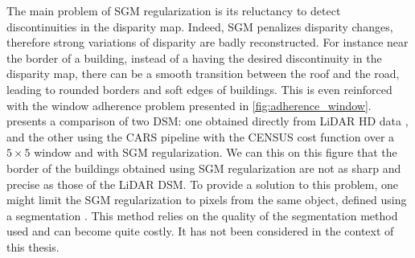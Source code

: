 The main problem of SGM regularization is its reluctancy to detect discontinuities in the disparity map. Indeed, SGM penalizes disparity changes, therefore strong variations of disparity are badly reconstructed. For instance near the border of a building, instead of a having the desired discontinuity in the disparity map, there can be a smooth transition between the roof and the road, leading to rounded borders and soft edges of buildings. This is even reinforced with the window adherence problem presented in \ref{fig:adherence_window}.  presents a comparison of two DSM: one obtained directly from LiDAR HD data \cite{monnet_lidarhd_2023}, and the other using the CARS pipeline with the CENSUS cost function over a $5\times5$ window and with SGM regularization. We can this on this figure that the border of the buildings obtained using SGM regularization are not as sharp and precise as those of the LiDAR DSM. To provide a solution to this problem, one might limit the SGM regularization to pixels from the same object, defined using a segmentation \cite{dumas_improving_2022}. This method relies on the quality of the segmentation method used and can become quite costly. It has not been considered in the context of this thesis. 

